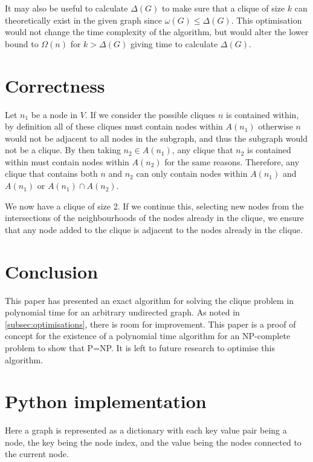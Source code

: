\documentclass[11pt]{article}
\begin{document}
It may also be useful to calculate $\Delta(G)$ to make sure that a clique of size $k$ can theoretically exist in the given graph since $\omega(G)\leq\Delta(G)$. This optimisation would not change the time complexity of the algorithm, but would alter the lower bound to $\Omega(n)$ for $k>\Delta(G)$ giving time to calculate $\Delta(G)$.

\section{Correctness}

Let $n_1$ be a node in $V$. If we consider the possible cliques $n$ is contained within, by definition all of these cliques must contain nodes within $A(n_1)$ otherwise $n$ would not be adjacent to all nodes in the subgraph, and thus the subgraph would not be a clique. By then taking $n_2\in A(n_1)$, any clique that $n_2$ is contained within must contain nodes within $A(n_2)$ for the same reasons. Therefore, any clique that contains both $n$ and $n_2$ can only contain nodes within $A(n_1)$ and $A(n_1)$ or $A(n_1)\cap A(n_2)$.

We now have a clique of size 2. If we continue this, selecting new nodes from the intersections of the neighbourhoods of the nodes already in the clique, we ensure that any node added to the clique is adjacent to the nodes already in the clique.

\section{Conclusion}

This paper has presented an exact algorithm for solving the clique problem in polynomial time for an arbitrary undirected graph. As noted in \cref{subsec:optimisations}, there is room for improvement. This paper is a proof of concept for the existence of a polynomial time algorithm for an NP-complete problem to show that P=NP. It is left to future research to optimise this algorithm.

\appendix
\section{Python implementation}
\label{apdx:a}
Here a graph is represented as a dictionary with each key value pair being a node, the key being the node index, and the value being the nodes connected to the current node.

\end{document}
